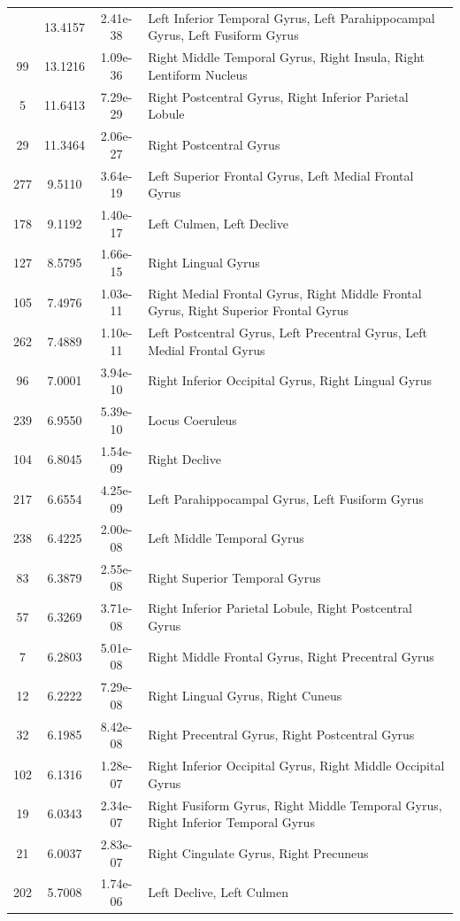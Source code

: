 \documentclass[10pt,letterpaper]{article}\usepackage[]{graphicx}\usepackage[]{color}
\begin{document}
\begin{longtable}[c]{cccp{3.2in}}
	\bottomrule
	\endlastfoot
	243 & 13.4157 & 2.41e-38 & Left Inferior Temporal Gyrus, Left Parahippocampal Gyrus, Left Fusiform Gyrus \\
	99 & 13.1216 & 1.09e-36 & Right Middle Temporal Gyrus, Right Insula, Right Lentiform Nucleus \\
	5 & 11.6413 & 7.29e-29 & Right Postcentral Gyrus, Right Inferior Parietal Lobule \\
	29 & 11.3464 & 2.06e-27 & Right Postcentral Gyrus \\
	277 & 9.5110 & 3.64e-19 & Left Superior Frontal Gyrus, Left Medial Frontal Gyrus \\
	178 & 9.1192 & 1.40e-17 & Left Culmen, Left Declive \\
	127 & 8.5795 & 1.66e-15 & Right Lingual Gyrus \\
	105 & 7.4976 & 1.03e-11 & Right Medial Frontal Gyrus, Right Middle Frontal Gyrus, Right Superior Frontal Gyrus\\
	262 & 7.4889 & 1.10e-11 & Left Postcentral Gyrus, Left Precentral Gyrus, Left Medial Frontal Gyrus \\
	96 & 7.0001 & 3.94e-10 & Right Inferior Occipital Gyrus, Right Lingual Gyrus \\
	239 & 6.9550 & 5.39e-10 & Locus Coeruleus \\
	104 & 6.8045 & 1.54e-09 & Right Declive \\
	217 & 6.6554 & 4.25e-09 & Left Parahippocampal Gyrus, Left Fusiform Gyrus \\
	238 & 6.4225 & 2.00e-08 & Left Middle Temporal Gyrus \\
	83 & 6.3879 & 2.55e-08 & Right Superior Temporal Gyrus \\
	57 & 6.3269 & 3.71e-08 & Right Inferior Parietal Lobule, Right Postcentral Gyrus \\
	7 & 6.2803 & 5.01e-08 & Right Middle Frontal Gyrus, Right Precentral Gyrus \\
	12 & 6.2222 & 7.29e-08 & Right Lingual Gyrus, Right Cuneus \\
	32 & 6.1985 & 8.42e-08 & Right Precentral Gyrus, Right Postcentral Gyrus \\
	102 & 6.1316 & 1.28e-07 & Right Inferior Occipital Gyrus, Right Middle Occipital Gyrus \\
	19 & 6.0343 & 2.34e-07 & Right Fusiform Gyrus, Right Middle Temporal Gyrus, Right Inferior Temporal Gyrus \\
	21 & 6.0037 & 2.83e-07 & Right Cingulate Gyrus, Right Precuneus \\
	202 & 5.7008 & 1.74e-06 & Left Declive, Left Culmen \\

\end{longtable}
\end{document}
